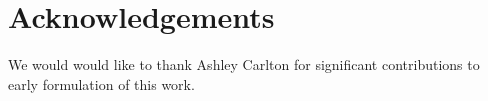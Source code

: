 \documentclass[12pt]{article}
\begin{document}
\section*{Acknowledgements}
We would would like to thank Ashley Carlton for significant contributions to early formulation of this work.



\end{document}
